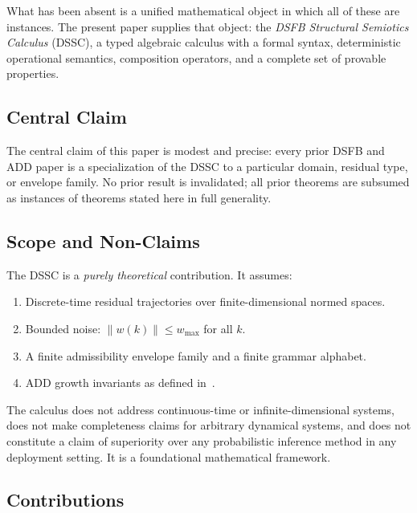 \documentclass[11pt,a4paper]{article}
\theoremstyle{plain}
\theoremstyle{definition}
\theoremstyle{remark}
\newcommand{\norm}[1]{\left\|#1\right\|}
\begin{document}
What has been absent is a unified mathematical object in which all of these are instances. The
present paper supplies that object: the \emph{DSFB Structural Semiotics Calculus} (DSSC), a
typed algebraic calculus with a formal syntax, deterministic operational semantics, composition
operators, and a complete set of provable properties.

\subsection{Central Claim}

The central claim of this paper is modest and precise: every prior DSFB and ADD paper is a
specialization of the DSSC to a particular domain, residual type, or envelope family. No prior
result is invalidated; all prior theorems are subsumed as instances of theorems stated here in
full generality.

\subsection{Scope and Non-Claims}

The DSSC is a \emph{purely theoretical} contribution. It assumes:
\begin{enumerate}[nosep]
  \item Discrete-time residual trajectories over finite-dimensional normed spaces.
  \item Bounded noise: $\norm{w(k)} \leq w_{\max}$ for all $k$.
  \item A finite admissibility envelope family and a finite grammar alphabet.
  \item ADD growth invariants as defined in~\cite{add}.
\end{enumerate}
The calculus does not address continuous-time or infinite-dimensional systems, does not make
completeness claims for arbitrary dynamical systems, and does not constitute a claim of
superiority over any probabilistic inference method in any deployment setting. It is a
foundational mathematical framework.

\subsection{Contributions}
\end{document}
